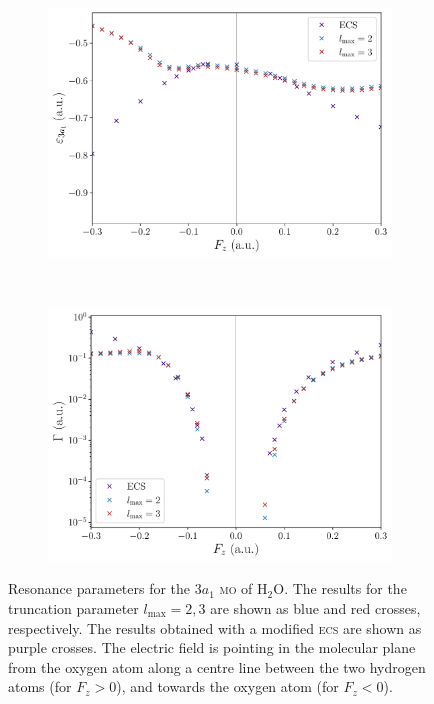 \begin{figure}
  \centering
  \begin{subfigure}[b]{0.45\linewidth}
    \centering
    \includegraphics[width=\textwidth]{figures/ch_H2O/partial_wave/Re3a1l23.pdf}
    \caption{}\label{fig:3a1_cap_re}
  \end{subfigure}
  \,
  \begin{subfigure}[b]{0.45\linewidth}
    \centering
    \includegraphics[width=\textwidth]{figures/ch_H2O/partial_wave/Im3a1l23.pdf}
    \caption{}\label{fig:3a1_cap_im}
  \end{subfigure}
  \caption{Resonance parameters for the $3a_{1}$ \textsc{mo} of
    H$_{2}$O. The results for the truncation parameter
    $l_{\mathrm{max}} = 2, 3$ are shown as blue and red crosses,
    respectively. The results obtained with a modified \textsc{ecs}
    are shown as purple crosses. The electric field is pointing in the
    molecular plane from the oxygen atom along a centre line between
    the two hydrogen atoms (for $F_{z} > 0$), and towards the oxygen
    atom (for $F_{z} < 0$).}
  \label{fig:3a1_cap}
\end{figure}






